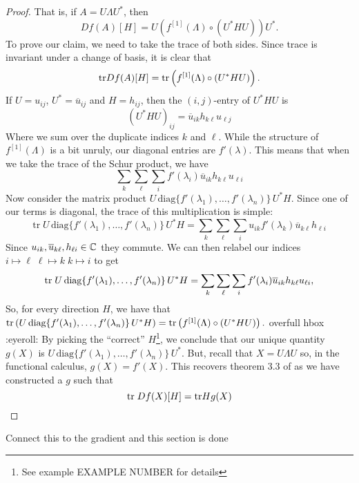 \begin{proof}
That is, if $A = U   \Lambda U ^{*} $, then
\[
  Df(A)[H] = U \left( f ^{[1]} (\Lambda) \circ (U ^{* } H U) \right)U ^{*}.
\]
%
To prove our claim, we need to take the trace of both sides. Since trace is
invariant under a change of basis, it is clear that
\[
  \mathrm{tr} Df(A)[H] = \mathrm{tr} \left( f ^{[1]} (\Lambda) \circ (U ^{* } H U) \right).
\]
If $U = u_{ij}$, $U ^{*} = \overline{u}_{ij}$ and $H = h_{ij}$, then the
$(i,j)$-entry of $U ^{*}HU$ is
\[
  {(U ^{* } H U)}_{ij} = \overline{u}_{ik}h_{k\ell}u_{\ell j}
\]
Where we sum over the duplicate indices $k$ and $\ell$. While the structure of
$f ^{[1]} (\Lambda)$ is a bit unruly, our diagonal entries are $f'(\lambda)$.
This means that when we take the trace of the Schur product, we have
\[
 \sum_k\sum_\ell \sum_i f'(\lambda_i)\overline{u}_{ik}h_{k\ell}u_{\ell i}
\]
Now consider the matrix product
$U\, \text{diag} \{f'(\lambda_1), \dots ,f'(\lambda_n)\} \,U ^{*} H $. Since one of our terms
is diagonal, the trace of this multiplication is simple:
\[
  \text{tr}\; U \,\text{diag} \{f'(\lambda_1), \dots ,f'(\lambda_n)\}\, U ^{*} H
  = \sum_k\sum_\ell\sum_i  u_{ik}f'(\lambda_k) \overline{u}_{k \ell} h_{\ell i}
\]
Since \(u_{ik}, \overline{u}_{k\ell}, h_{\ell i} \in \mathbb{C} \) they commute. We can
then relabel our indices
$i \mapsto \ell\; \ell \mapsto k \; k \mapsto i $ to get
\[
  \mathrm{tr}\; U \,\text{diag} \{f'(\lambda_1), \dots ,f'(\lambda_n)\}\, U ^{*} H
  = \sum_k\sum_\ell \sum_i f'(\lambda_i) \overline{u}_{i k} h_{k \ell}u_{\ell i},
\]
So, for every direction \(H\), we have that
$\mathrm{tr} \left( U\, \text{diag} \{f'(\lambda_1), \dots ,f'(\lambda_n)\} \,U ^{*} H\right) =
   \mathrm{tr} \left( f ^{[1]} (\Lambda) \circ (U ^{* } H U) \right). $
{\color{red} overfull hbox :eyeroll:}
By picking the ``correct'' \(H\)\footnote{See example EXAMPLE NUMBER for
  details}, we conclude that our unique quantity \(g(X)\) is
\(U\, \text{diag} \{f'(\lambda_1), \dots ,f'(\lambda_n)\} \,U ^{*} \). But,
recall that \(X=U\Lambda U\) so, in the functional calculus, $g(X) = f'(X)$.
This recovers theorem 3.3 of \cite{pascoeTrace2020} as we have constructed a
\(g\) such that
\[
  \mathrm{tr} \; Df(X)[H] = \mathrm{tr} H g(X)
\]
\end{proof}

{\color{blue} Connect this to the gradient and this section is done}
